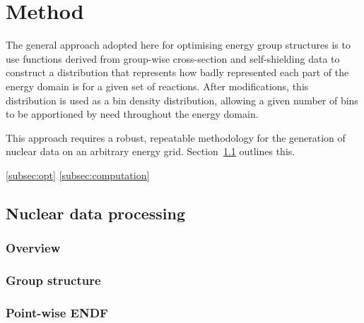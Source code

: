 


\section{Method}
\label{sec:method}
The general approach adopted here for optimising energy group structures is to use functions derived from group-wise cross-section and self-shielding data to construct a distribution that represents how badly represented each part of the energy domain is for a given set of reactions. After modifications, this distribution is used as a bin density distribution, allowing a given number of bins to be apportioned by need throughout the energy domain. 

This approach requires a robust, repeatable methodology for the generation of nuclear data on an arbitrary energy grid. Section~\ref{subsec:nd_processing} outlines this. 

\ref{subsec:opt} \ref{subsec:computation}

\subsection{Nuclear data processing}
\label{subsec:nd_processing}
\subsubsection{Overview}

\subsubsection{Group structure}

\subsubsection{Point-wise ENDF}

